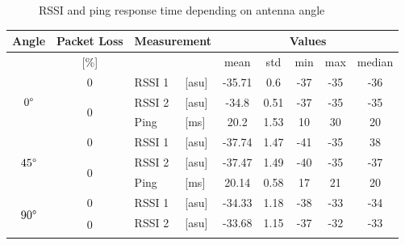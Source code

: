 \begin{figure}[H]
\begin{subfigure}{0.45\textwidth}
    \end{subfigure}
    \vspace{\ftspace}
    \caption{RSSI and ping response time depending on antenna angle}
    \label{fig:antennaangle}
\end{figure}

\begin{table}[H]
    \centering
    \begin{tabular}{|c|c|l|l|c|c|c|c|c|}
    \hline
        Angle & Packet Loss & \multicolumn{2}{l|}{Measurement} & \multicolumn{5}{c|}{Values} \\\hline
        [\degree] & [\%] & \multicolumn{2}{l|}{} & mean & std & min & max & median \\\hline\hline
        \multirow{3}{*}{$0\degree$} & \multirow{1}{*}{0} & RSSI 1 & [asu] & -35.71 & 0.6 & -37 & -35 & -36 \\\cline{2-9}%
        & \multirow{2}{*}{0} & RSSI 2 & [asu] & -34.8 & 0.51 & -37 & -35 & -35 \\\cline{3-9}
        && Ping & [ms] & 20.2 & 1.53 & 10 & 30 & 20 \\\hline\hline
        \multirow{3}{*}{$45\degree$} & \multirow{1}{*}{0} & RSSI 1 & [asu] & -37.74 & 1.47 & -41 & -35 & 38 \\\cline{2-9}%
        & \multirow{2}{*}{0} & RSSI 2 & [asu] & -37.47 &1.49 & -40 & -35 & -37 \\\cline{3-9}
        && Ping & [ms] & 20.14 & 0.58 & 17 & 21 & 20 \\\hline\hline
        \multirow{3}{*}{$90\degree$} & \multirow{1}{*}{0} & RSSI 1 & [asu] & -34.33 & 1.18 & -38 & -33 & -34 \\\cline{2-9}%
        & \multirow{2}{*}{0} & RSSI 2 & [asu] & -33.68 & 1.15 & -37 & -32 & -33 \\\cline{3-9}

\end{tabular}
\end{table}
